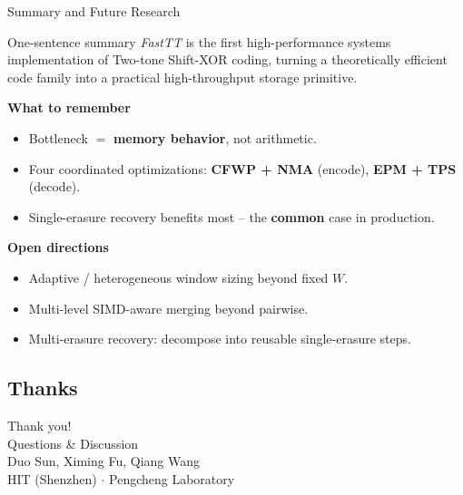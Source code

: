 \documentclass[aspectratio=169]{beamer}
\newcommand{\design}{\textit{FastTT}\xspace}
\newcommand{\sxor}{Shift-XOR\xspace}
\newcommand{\twotone}{Two-tone\xspace}
\begin{document}
\begin{frame}[t]{Summary and Future Research}
\small
\begin{block}{One-sentence summary}
\design is the first high-performance systems implementation of \twotone \sxor coding, turning a theoretically efficient code family into a practical high-throughput storage primitive.
\end{block}

\vspace{0.4em}
\textbf{What to remember}
\begin{itemize}
  \setlength{\itemsep}{0.2em}
  \item Bottleneck $=$ \textbf{memory behavior}, not arithmetic.
  \item Four coordinated optimizations: \textbf{CFWP + NMA} (encode), \textbf{EPM + TPS} (decode).
  \item Single-erasure recovery benefits most -- the \textbf{common} case in production.
\end{itemize}

\vspace{0.4em}
\textbf{Open directions}
\begin{itemize}
  \setlength{\itemsep}{0.2em}
  \item Adaptive / heterogeneous window sizing beyond fixed $W$.
  \item Multi-level SIMD-aware merging beyond pairwise.
  \item Multi-erasure recovery: decompose into reusable single-erasure steps.
\end{itemize}
\end{frame}

\subsection{Thanks}

\begin{frame}[plain]
  \centering
  \vfill
  {\Huge Thank you!}\\[1.2em]
  {\Large Questions \& Discussion}\\[2em]
  {\footnotesize Duo Sun, Ximing Fu, Qiang Wang \\[0.3em] HIT (Shenzhen) $\cdot$ Pengcheng Laboratory}
  \vfill
\end{frame}
\end{document}
